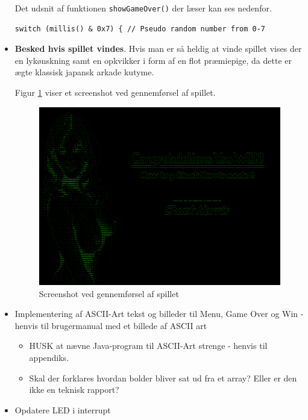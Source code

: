 \begin{itemize}
Det udsnit af funktionen \texttt{showGameOver()} der læser  kan ses nedenfor.

\begin{lstlisting}[frame=single,firstnumber=6]
switch (millis() & 0x7) { // Pseudo random number from 0-7
\end{lstlisting}

\item \textbf{Besked hvis spillet vindes}. Hvis man er så heldig at vinde spillet vises der en lykønskning samt en opkvikker i form af en flot præmiepige, da dette er ægte klassisk japansk arkade kutyme.

Figur \ref{fig:won_normal} viser et screenshot ved gennemførsel af spillet.

\begin{figure}[h!]
\centering
\includegraphics[scale=0.25]{figs/screenshots/won_normal.png}
\caption{Screenshot ved gennemførsel af spillet}
\label{fig:won_normal}
\end{figure}

\item Implementering af ASCII-Art tekst og billeder til Menu, Game Over og Win - henvis til brugermanual med et billede af ASCII art
\begin{itemize}
\item HUSK at nævne Java-program til ASCII-Art strenge - henvis til appendiks.
\item Skal der forklares hvordan bolder bliver sat ud fra et array? Eller er den ikke en teknisk rapport?
\end{itemize}

\item Opdatere LED i interrupt
\end{itemize}

